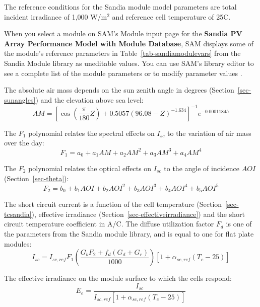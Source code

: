 \documentclass[12pt,letterpaper]{article}
\newcommand\AOI{\ensuremath{\mathit{AOI}}}
\begin{document}
The reference conditions for the Sandia module model parameters are total incident irradiance of 1,000 W/m$^2$ and reference cell temperature of 25\degree C. 

When you select a module on SAM's Module input page for the \textbf{Sandia PV Array Performance Model with Module Database}, SAM displays some of the module's reference parameters in Table~\ref{tab-sandiamodulevars} from the Sandia Module library as uneditable values. You can use SAM's library editor to see a complete list of the module parameters or to modify parameter values \citep{help-libraries}.

The absolute air mass depends on the sun zenith angle in degrees (Section~\ref{sec-sunangles}) and the elevation above sea level:
\begin{equation}\label{eqn-sandiaam}
AM = \left[ \cos(\frac{\pi}{180} Z ) + 0.5057 (96.08 - Z)^{-1.634} \right]^{-1} e^{-0.0001184 h}
\end{equation}

The $F_1$ polynomial relates the spectral effects on $I_{sc}$ to the variation of air mass over the day:
\begin{equation}
F_1 = a_0 + a_1 AM + a_2 AM^2 + a_3 AM^3 + a_4 AM^4
\end{equation}

The $F_2$ polynomial relates the optical effects on $I_{sc}$ to the angle of incidence $\AOI$ (Section~\ref{sec-theta}):
\begin{equation}
F_2 = b_0 + b_1\AOI
		+ b_2\AOI^2
		+ b_3\AOI^3
		+ b_4\AOI^4
		+ b_5\AOI^5
\end{equation}

The short circuit current is a function of the cell temperature (Section~\ref{sec-tcsandia}), effective irradiance (Section~\ref{sec-effectiveirradiance}) and the short circuit temperature coefficient in A/\degree C. The diffuse utilization factor $F_d$ is one of the parameters from the Sandia module library, and is equal to one for flat plate modules:
\begin{equation}
I_{sc} = I_{sc,ref} F_1 \left( \frac{G_b F_2 + f_d (G_d+G_r)}{1000} \right) \left[1+\alpha_{sc,ref} (T_c-25)\right]
\end{equation}

The effective irradiance on the module surface to which the cells respond:
\begin{equation}
E_e = \frac{I_{sc}}{I_{sc,ref} \left[1 + \alpha_{sc,ref} (T_c - 25)\right]}
\end{equation}
\end{document}
